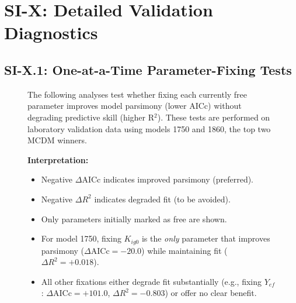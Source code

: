 
\section{SI-X: Detailed Validation Diagnostics}

\subsection{SI-X.1: One-at-a-Time Parameter-Fixing Tests}

\begin{figure}[H]
\centering
\small
The following analyses test whether fixing each currently free parameter improves model 
parsimony (lower AICc) without degrading predictive skill (higher R$^2$). These tests are 
performed on laboratory validation data using models 1750 and 1860, the top two MCDM winners.

\textbf{Interpretation:}
\begin{itemize}
  \item Negative $\Delta\mathrm{AICc}$ indicates improved parsimony (preferred).
  \item Negative $\Delta R^2$ indicates degraded fit (to be avoided).
  \item Only parameters initially marked as free are shown.
  \item For model 1750, fixing $K_{ig0}$ is the \emph{only} parameter that improves parsimony 
        ($\Delta\mathrm{AICc}=-20.0$) while maintaining fit ($\Delta R^2=+0.018$).
  \item All other fixations either degrade fit substantially (e.g., fixing $Y_{ef}$: 
        $\Delta\mathrm{AICc}=+101.0$, $\Delta R^2=-0.803$) or offer no clear benefit.
\end{itemize}
\end{figure}

